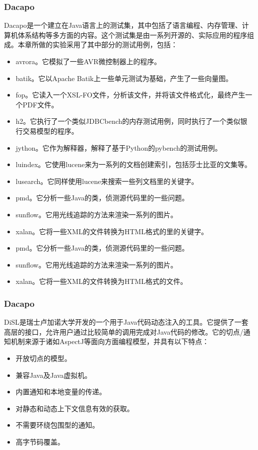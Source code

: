 \subsubsection{Dacapo}

Dacapo\cite{dacapo}是一个建立在Java语言上的测试集，其中包括了语言编程、内存管理、计算机体系结构等多方面的内容。这个测试集是由一系列开源的、实际应用的程序组成。本章所做的实验采用了其中部分的测试用例，包括：

\begin{itemize}
	\item avrora。它模拟了一些AVR微控制器上的程序。
	\item batik。它以Apache Batik上一些单元测试为基础，产生了一些向量图。
	\item fop。它读入一个XSL-FO文件，分析该文件，并将该文件格式化，最终产生一个PDF文件。
	\item h2。它执行了一个类似JDBCbench的内存测试用例，同时执行了一个类似银行交易模型的程序。
	\item jython。它作为解释器，解释了基于Python的pybench的测试用例。
	\item luindex。它使用lucene来为一系列的文档创建索引，包括莎士比亚的文集等。
	\item lusearch。它同样使用lucene来搜索一些列文档里的关键字。
	\item pmd。它分析一些Java的类，侦测源代码里的一些问题。
	\item sunflow。它用光线追踪的方法来渲染一系列的图片。
	\item xalan。它将一些XML的文件转换为HTML格式的里的关键字。
	\item pmd。它分析一些Java的类，侦测源代码里的一些问题。
	\item sunflow。它用光线追踪的方法来渲染一系列的图片。
	\item xalan。它将一些XML的文件转换为HTML格式的文件。
\end{itemize}

\subsubsection{Dacapo}

DiSL\cite{disl}是瑞士卢加诺大学开发的一个用于Java代码动态注入的工具。它提供了一套高层的接口，允许用户通过比较简单的调用完成对Java代码的修改。它的切点/通知机制来源于诸如AspectJ等面向方面编程模型，并具有以下特点：

\begin{itemize}
	\item 开放切点的模型。
	\item 兼容Java及Java虚拟机。
	\item 内置通知和本地变量的传递。
	\item 对静态和动态上下文信息有效的获取。
	\item 不需要环绕包围型的通知。
	\item 高字节码覆盖。
\end{itemize}

